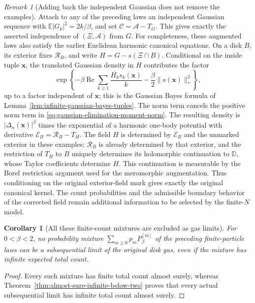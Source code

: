 \documentclass[11pt,a4paper]{article}
\numberwithin{equation}{section}
\newtheorem{corollary}[theorem]{Corollary}
\theoremstyle{definition}
\theoremstyle{remark}
\newtheorem{remark}[theorem]{Remark}
\newcommand{\D}{\mathbb D}
\begin{document}
\begin{remark}[Adding back the independent Gaussian does not remove the examples]
Attach to any of the preceding laws an independent Gaussian sequence
with $\mathbb E|G_k|^2=2k/\beta$, and set
$\mathcal C=\mathcal A-T_G$. This gives exactly the asserted independence
of $(\Xi,\mathcal A)$ from $G$.
For completeness, these augmented laws also satisfy the earlier
Euclidean harmonic canonical equations. On a disk $B$, its exterior
fixes $\mathcal R_B$, and write $H=G-s(\Xi\cap B)$. Conditional on the
inside tuple $\mathbf x$, the translated Gaussian density in $H$
contributes the factor
\[
 \exp\left\{-\beta\operatorname{Re}\sum_{k\ge1}
                 \frac{\overline{H_k}s_k(\mathbf x)}k
                  -\frac\beta2\|s(\mathbf x)\|_*^2\right\},
\]
up to a factor independent of $\mathbf x$; this is the Gaussian Bayes
formula of Lemma~\ref{lem:infinite-gaussian-bayes-tuples}.
The norm term cancels the positive norm term in
\eqref{eq:gaussian-elimination-moment-norm}. The resulting density is
$|\Delta_n(\mathbf x)|^\beta$ times the exponential of a harmonic
one-body potential with derivative
$\mathcal E_B=\mathcal R_B-T_H$.
The field $H$ is determined by $\mathcal E_B$ and the unmarked exterior
in these examples: $\mathcal R_B$ is already determined by that
exterior, and the restriction of $T_H$ to $B$ uniquely determines its
holomorphic continuation to $\D$, whose Taylor coefficients determine
$H$. This continuation is measurable by the Borel restriction argument
used for the meromorphic augmentation.
Thus conditioning on the original exterior-field mark gives exactly
the original canonical kernel. The count probabilities and the
admissible boundary behavior of the corrected field remain additional
information to be selected by the finite-$N$ model.
\end{remark}

\begin{corollary}[All these finite-count mixtures are excluded as gas limits]
\label{cor:finite-green-mixtures-excluded}
For $0<\beta<2$, no probability mixture
$\sum_{m\ge0}p_mP^{[m]}_\beta$ of the preceding finite-particle laws
can be a subsequential limit of the original disk gas, even if the
mixture has infinite expected total count.
\end{corollary}

\begin{proof}
Every such mixture has finite total count almost surely, whereas
Theorem~\ref{thm:almost-sure-infinite-below-two} proves that every
actual subsequential limit has infinite total count almost surely.
\end{proof}
\end{document}
